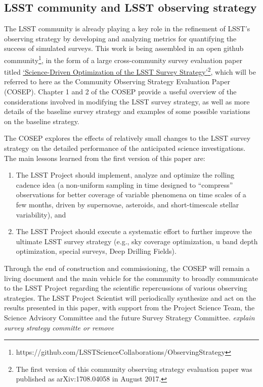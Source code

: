 \documentclass[DM,lsstdraft,toc,usenatbib]{lsstdoc}
\begin{document}
\subsection{LSST community and LSST observing strategy}

The LSST community is already playing a key role in the refinement of LSST's observing strategy 
by developing and analyzing metrics for quantifying the success of simulated surveys.
This work is being assembled in an open github community\footnote{
https://github.com/LSSTScienceCollaborations/ObservingStrategy}, 
in the form of a large cross-community survey evaluation paper
titled \href{http://ls.st/9fw}{`Science-Driven Optimization of the LSST Survey Strategy'}\footnote{The first 
version of this community observing strategy evaluation paper was published as arXiv:1708.04058 in August 2017.},
which will be referred to here as the Community Observing Strategy Evaluation Paper (COSEP). 
Chapter 1 and 2 of the COSEP provide a useful overview of the considerations involved in 
modifying the LSST survey strategy, as well as more details of the baseline survey strategy and 
examples of some possible variations on the baseline strategy. 

The COSEP explores the effects of relatively small changes to the LSST survey strategy
on the detailed performance of the anticipated science investigations. The main lessons 
learned from the first version of this paper are: 
\begin{enumerate} 
\item The LSST Project should implement, analyze and optimize the rolling cadence idea
(a non-uniform sampling in time designed to ``compress'' observations for better coverage
of variable phenomena on time scales of a few months, driven by supernovae, asteroids, and
short-timescale stellar variability), and 
\item The LSST Project should execute a systematic effort to further improve the ultimate
LSST survey strategy (e.g., sky coverage optimization, u band depth optimization, special 
surveys, Deep Drilling Fields). 
\end{enumerate} 

Through the end of construction and commissioning, the COSEP will 
remain a living document and the main vehicle for the community to broadly 
communicate to the LSST Project regarding the scientific repercussions of various observing strategies. The LSST Project Scientist will 
periodically synthesize and act on the results presented in this paper, with support from the 
Project Science Team, the Science Advisory Committee and the future Survey Strategy Committee. {\it explain survey strategy committe or remove}
\end{document}
